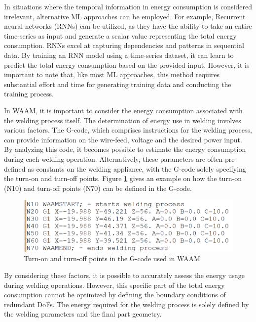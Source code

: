 In situations where the temporal information in energy consumption is considered irrelevant, alternative \acrshort{ML} approaches can be employed. For example, Recurrent neural-networks (\acrshort{RNN}s) can be utilized, as they have the ability to take an entire time-series as input and generate a scalar value representing the total energy consumption. \acrshort{RNN}s excel at capturing dependencies and patterns in sequential data. By training an \acrshort{RNN} model using a time-series dataset, it can learn to predict the total energy consumption based on the provided input. However, it is important to note that, like most \acrshort{ML} approaches, this method requires substantial effort and time for generating training data and conducting the training process.

In \acrshort{WAAM}, it is important to consider the energy consumption associated with the welding process itself. The determination of energy use in welding involves various factors. The G-code, which comprises instructions for the welding process, can provide information on the wire-feed, voltage and the desired power input. By analyzing this code, it becomes possible to estimate the energy consumption during each welding operation. Alternatively, these parameters are often pre-defined as constants on the welding appliance, with the G-code solely specifying the turn-on and turn-off points. Figure \ref{waamgcode} gives an example on how the turn-on (N10) and turn-off points (N70) can be defined in the G-code.

\begin{figure}[H]
	\centerline{\includegraphics[width=.75\textwidth]{figures/waamgcode.png}}
	\caption{Turn-on and turn-off points in the G-code used in WAAM}
	\label{waamgcode}
\end{figure}

By considering these factors, it is possible to accurately assess the energy usage during welding operations. However, this specific part of the total energy consumption cannot be optimized by defining the boundary conditions of redundant \acrshort{DoF}s. The energy required for the welding process is solely defined by the welding parameters and the final part geometry.

\newpage
